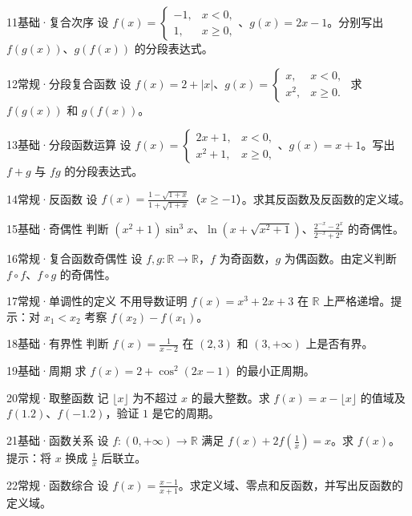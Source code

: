 \begin{exercise}{11}{基础·复合次序}
设 $f(x)=\begin{cases}-1,&x<0,\\1,&x\ge0,\end{cases}$、$g(x)=2x-1$。分别写出 $f(g(x))$、$g(f(x))$ 的分段表达式。
\end{exercise}
\begin{exercise}{12}{常规·分段复合函数}
设 $f(x)=2+|x|$、$g(x)=\begin{cases}x,&x<0,\\x^2,&x\ge0.\end{cases}$ 求 $f(g(x))$ 和 $g(f(x))$。
\end{exercise}
\begin{exercise}{13}{基础·分段函数运算}
设 $f(x)=\begin{cases}2x+1,&x<0,\\x^2+1,&x\ge0,\end{cases}$、$g(x)=x+1$。写出 $f+g$ 与 $fg$ 的分段表达式。
\end{exercise}
\begin{exercise}{14}{常规·反函数}
设 $f(x)=\frac{1-\sqrt{1+x}}{1+\sqrt{1+x}}$（$x\ge-1$）。求其反函数及反函数的定义域。
\end{exercise}
\begin{exercise}{15}{基础·奇偶性}
判断 $(x^2+1)\sin^3x$、$\ln(x+\sqrt{x^2+1})$、$\frac{2^{-x}-2^x}{2^{-x}+2^x}$ 的奇偶性。
\end{exercise}
\begin{exercise}{16}{常规·复合函数奇偶性}
设 $f,g:\mathbb R\to\mathbb R$，$f$ 为奇函数，$g$ 为偶函数。由定义判断 $f\circ f$、$f\circ g$ 的奇偶性。
\end{exercise}
\begin{exercise}{17}{常规·单调性的定义}
不用导数证明 $f(x)=x^3+2x+3$ 在 $\mathbb R$ 上严格递增。提示：对 $x_1<x_2$ 考察 $f(x_2)-f(x_1)$。
\end{exercise}
\begin{exercise}{18}{基础·有界性}
判断 $f(x)=\frac{1}{x-2}$ 在 $(2,3)$ 和 $(3,+\infty)$ 上是否有界。
\end{exercise}
\begin{exercise}{19}{基础·周期}
求 $f(x)=2+\cos^2(2x-1)$ 的最小正周期。
\end{exercise}
\begin{exercise}{20}{常规·取整函数}
记 $\lfloor x\rfloor$ 为不超过 $x$ 的最大整数。求 $f(x)=x-\lfloor x\rfloor$ 的值域及 $f(1.2)$、$f(-1.2)$，验证 $1$ 是它的周期。
\end{exercise}
\begin{exercise}{21}{基础·函数关系}
设 $f:(0,+\infty)\to\mathbb R$ 满足 $f(x)+2f(\frac{1}{x})=x$。求 $f(x)$。提示：将 $x$ 换成 $\frac{1}{x}$ 后联立。
\end{exercise}
\begin{exercise}{22}{常规·函数综合}
设 $f(x)=\frac{x-1}{x+1}$。求定义域、零点和反函数，并写出反函数的定义域。
\end{exercise}
